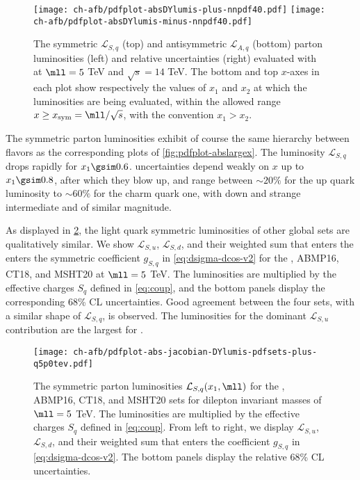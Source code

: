\begin{figure}[!t]
 \centering
 \texttt{[image: ch-afb/pdfplot-absDYlumis-plus-nnpdf40.pdf]}
 \texttt{[image: ch-afb/pdfplot-absDYlumis-minus-nnpdf40.pdf]}
 \caption{The symmetric $\mathcal{L}_{S,q}$ (top)
   and antisymmetric $\mathcal{L}_{A,q}$ (bottom)
   parton
   luminosities (left) and relative uncertainties (right) evaluated with
    \nnlo at $\mll=5$ TeV and $\sqrt{s}=14$ TeV.
The bottom  and top $x$-axes in each plot show respectively the values
of $x_1$ and $x_2$  at which the
luminosities are being evaluated, within the allowed range
$x \ge x_{\rm sym}=\mll/\sqrt{s}$, with the convention $x_1>x_2$.}    
 \label{fig:pdfplot-absDYlumis-plus-nnpdf40}
\end{figure}

The symmetric parton luminosities exhibit of course the same hierarchy
between flavors
as the corresponding \pdf plots of \cref{fig:pdfplot-abslargex}. 
%
The luminosity $\mathcal{L}_{S,q}$  drops rapidly for
$x_1\gsim 0.6$. \pdf  uncertainties  depend weakly on  $x$
up to $x_1\gsim 0.8$, after which they blow up, and range between $\sim 20\%$
for the up quark luminosity to $\sim 60\%$ for the charm quark one,
with down and strange intermediate and of similar magnitude.

As displayed in \cref{fig:mll_dep_lumi_plus}, the light quark symmetric luminosities of other global \pdf sets
are qualitatively similar.
%
We show $\mathcal{L}_{S,u}$,  $\mathcal{L}_{S,d}$,
and their weighted sum that enters the  enters the
symmetric coefficient $g_{S,q}$ in \cref{eq:dsigma-dcos-v2}
for the , ABMP16,
CT18, and MSHT20 at $\mll=5$ TeV.
%
The luminosities are multiplied by the effective charges
$S_q$ defined in \cref{eq:coup},
and the bottom panels display the corresponding 68\% CL \pdf uncertainties.
%
Good agreement between the four sets, with a similar shape
of $\mathcal{L}_{S,q}$, is observed.
%
The \pdf luminosities for the dominant $\mathcal{L}_{S,u}$ contribution are the largest for .

\begin{figure}[!t]
 \centering
 \texttt{[image: ch-afb/pdfplot-abs-jacobian-DYlumis-pdfsets-plus-q5p0tev.pdf]}
  \caption{The symmetric 
   parton luminosities $\mathcal{L}_{S,q}(x_1,\mll)$ for the , ABMP16,
   CT18, and MSHT20 \nnlo \pdf sets for dilepton
   invariant masses of $\mll=5$ TeV.
   The luminosities are multiplied by the effective charges
   $S_q$ defined in \cref{eq:coup}.
   From left to right, we display $\mathcal{L}_{S,u}$,  $\mathcal{L}_{S,d}$,
   and their weighted sum that enters the  coefficient $g_{S,q}$ in \cref{eq:dsigma-dcos-v2}.
   The bottom panels display the relative 68\% CL \pdf uncertainties.
    }    
 \label{fig:mll_dep_lumi_plus}
\end{figure}

